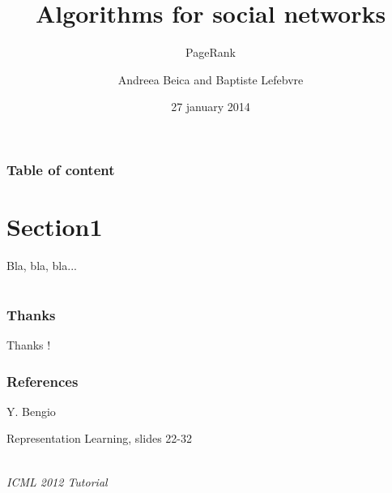 \documentclass{beamer}
\begin{document}
  
  \title{Algorithms for social networks}
  \subtitle{PageRank}
  \author{Andreea Beica and Baptiste Lefebvre}
  \date{27 january 2014}
  \maketitle

  
\begin{frame}
  \frametitle{Table of content}
  \tableofcontents
\end{frame}


\section{Section1}

\begin{frame}
Bla, bla, bla...
\end{frame}


\section{}

\begin{frame}
  \frametitle{Thanks}
  \begin{center}
    Thanks !
  \end{center}
\end{frame}

\begin{frame}
  \frametitle{References}
  Y. Bengio\\
  \begin{bf} Representation Learning, slides 22-32 \end{bf}\\
  \emph{ICML 2012 Tutorial}
\end{frame}
\end{document}

